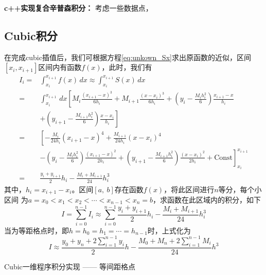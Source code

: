 \begin{example}
	\textbf{c++实现复合辛普森积分：} 考虑一些数据点，
	
\end{example}

\subsection{Cubic积分}
在完成cubic插值后，我们可根据方程\eqref{eq:unkown_Sx}求出原函数的近似，区间$[x_i, x_{i+1}]$区间内有函数$f(x)$，此时，我们有
\begin{equation}
	\begin{aligned}
		I_i =& \int_{x_i}^{x_{i+1}} f(x) \, dx \approx \int_{x_i}^{x_{i+1}} S(x) \, dx \\
		=& \int_{x_i}^{x_{i+1}} \, dx \left[ M_i \frac{\left(x_{i+1}-x\right)^3}{6 h_i}+M_{i+1} \frac{\left(x-x_i\right)^3}{6 h_i}+\left(y_i-\frac{M_i h_i^2}{6}\right) \frac{x_{i+1}-x}{h_i} \right. \\
		 &\left. + \left(y_{i+1}-\frac{M_{i+1} h_i^2}{6}\right) \frac{x-x_i}{h_i} \right]	\\
		=& \left[ -\frac{M_i}{24h_i} \left(x_{i+1}-x\right)^4 + \frac{M_{i+1}}{24h_i}\left(x-x_i\right)^4 \right. \\
		 &\left. -\left(y_i-\frac{M_i h_i^2}{6}\right) \frac{(x_{i+1}-x)^2}{2h_i} + \left(y_{i+1}-\frac{M_{i+1} h_i^2}{6}\right) \frac{(x-x_i)^2}{2h_i} + \text{Const} \right]_{x_i}^{x_{i+1}}	\\
		=& \frac{y_i + y_{i+1}}{2} h_i - \frac{M_{i} + M_{i+1}}{24} h_i^3
	\end{aligned}
\end{equation} 
其中，$h_i = x_{i+1}-x_{i}$。区间$[a,\ b]$存在函数$f(x)$，将此区间进行$n$等分，每个小区间
为$a = x_0 < x_1 < x_2 < \cdots < x_{n-1} < x_n = b $，求函数在此区域内的积分，如下
\begin{equation}
	I = \sum_{i=0}^{n-1} I_{i} \approx \sum_{i=0}^{n-1} \frac{y_i + y_{i+1}}{2} h_i - \frac{M_{i} + M_{i+1}}{24} h_i^3
\end{equation} 
当为等距格点时，即$h = h_0 = h_1 =\cdots = h_{n-1}$时，上式化为
\begin{equation}
	I\approx\frac{y_0+y_n+2\sum_{i=1}^{n-1}y_i}{2}h-\frac{M_0+M_n+2\sum_{i=1}^{n-1}M_i}{24}h^3
    \label{eq:cubic-int-equidistant}
\end{equation} 

\begin{example}{Cubic一维程序积分实现 —— 等间距格点}

\end{example}

